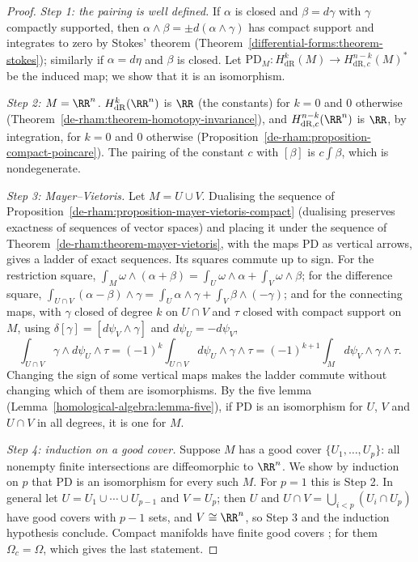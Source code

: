 \begin{proof}
\emph{Step 1: the pairing is well defined.} If $\alpha$ is closed and $\beta = d\gamma$ with $\gamma$ compactly supported, then $\alpha \wedge \beta = \pm d(\alpha \wedge \gamma)$ has compact support and integrates to zero by Stokes' theorem
(Theorem~\ref{differential-forms:theorem-stokes}); similarly if $\alpha = d\eta$ and $\beta$ is closed. Let $\mathrm{PD}_M \colon H^k_{\mathrm{dR}}(M) \to H^{n-k}_{\mathrm{dR},c}(M)^*$ be the induced map; we show that it is an isomorphism.

\emph{Step 2: $M = \RR^n$.} $H^k_{\mathrm{dR}}(\RR^n)$ is $\RR$ (the constants) for $k = 0$ and $0$ otherwise (Theorem~\ref{de-rham:theorem-homotopy-invariance}), and $H^{n-k}_{\mathrm{dR},c}(\RR^n)$ is $\RR$, by integration, for $k = 0$ and
$0$ otherwise (Proposition~\ref{de-rham:proposition-compact-poincare}). The pairing of the constant $c$ with $[\beta]$ is $c\int\beta$, which is nondegenerate.

\emph{Step 3: Mayer--Vietoris.} Let $M = U \cup V$. Dualising the sequence of Proposition~\ref{de-rham:proposition-mayer-vietoris-compact} (dualising preserves exactness of sequences of vector spaces) and placing it under the sequence of
Theorem~\ref{de-rham:theorem-mayer-vietoris}, with the maps $\mathrm{PD}$ as vertical arrows, gives a ladder of exact sequences. Its squares commute up to sign. For the restriction square, $\int_M\omega \wedge (\alpha + \beta) = \int_U\omega \wedge \alpha + \int_V\omega \wedge \beta$;
for the difference square, $\int_{U \cap V}(\alpha - \beta) \wedge \gamma = \int_U\alpha \wedge \gamma + \int_V\beta \wedge (-\gamma)$; and for the connecting maps, with $\gamma$ closed of degree $k$ on $U \cap V$ and $\tau$ closed with compact support on $M$,
using $\delta[\gamma] = [d\psi_V \wedge \gamma]$ and $d\psi_U = -d\psi_V$,
\[
\int_{U \cap V}\gamma \wedge d\psi_U \wedge \tau = (-1)^k\int_{U \cap V}d\psi_U \wedge \gamma \wedge \tau = (-1)^{k+1}\int_Md\psi_V \wedge \gamma \wedge \tau .
\]
Changing the sign of some vertical maps makes the ladder commute without changing which of them are isomorphisms. By the five lemma (Lemma~\ref{homological-algebra:lemma-five}), if $\mathrm{PD}$ is an isomorphism for $U$, $V$ and $U \cap V$ in all degrees,
it is one for $M$.

\emph{Step 4: induction on a good cover.} Suppose $M$ has a good cover $\{U_1, \ldots, U_p\}$: all nonempty finite intersections are diffeomorphic to $\RR^n$. We show by induction on $p$ that $\mathrm{PD}$ is an isomorphism for every such
$M$. For $p = 1$ this is Step 2. In general let $U = U_1 \cup \cdots \cup U_{p-1}$ and $V = U_p$; then $U$ and $U \cap V = \bigcup_{i<p}(U_i \cap U_p)$ have good covers with $p - 1$ sets, and $V \cong \RR^n$, so Step 3 and the induction
hypothesis conclude. Compact manifolds have finite good covers \cite[Chapter I, Section 5]{bott-tu}; for them $\Omega_c = \Omega$, which gives the last statement.
\end{proof}

